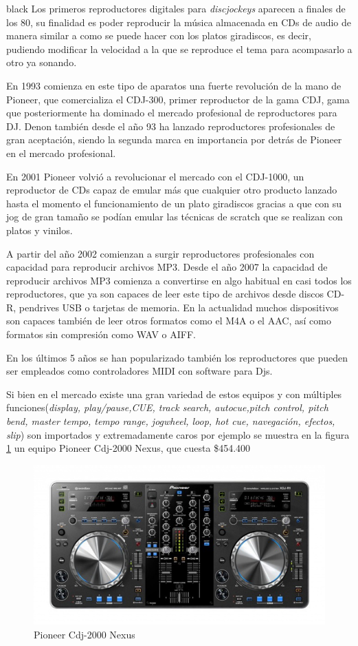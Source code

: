 \documentclass[11pt]{charter}
\begin{document}
\begin{consigna}{black}
Los primeros reproductores digitales para \textit{discjockeys} aparecen a finales de los 80, su finalidad es poder reproducir la música almacenada en CDs de audio de manera similar a como se puede hacer con los platos giradiscos, es decir, pudiendo modificar la velocidad a la que se reproduce el tema para acompasarlo a otro ya sonando.

En 1993 comienza en este tipo de aparatos una fuerte revolución de la mano de Pioneer, que comercializa el CDJ-300, primer reproductor de la gama CDJ, gama que posteriormente ha dominado el mercado profesional de reproductores para DJ. Denon también desde el año 93 ha lanzado reproductores profesionales de gran aceptación, siendo la segunda marca en importancia por detrás de Pioneer en el mercado profesional.

En 2001 Pioneer volvió a revolucionar el mercado con el CDJ-1000, un reproductor de CDs capaz de emular más que cualquier otro producto lanzado hasta el momento el funcionamiento de un plato giradiscos gracias a que con su jog de gran tamaño se podían emular las técnicas de scratch que se realizan con platos y vinilos. 

A partir del año 2002 comienzan a surgir reproductores profesionales con capacidad para reproducir archivos MP3. Desde el año 2007 la capacidad de reproducir archivos MP3 comienza a convertirse en algo habitual en casi todos los reproductores, que ya son capaces de leer este tipo de archivos desde discos CD-R, pendrives USB o tarjetas de memoria. En la actualidad muchos dispositivos son capaces también de leer otros formatos como el M4A o el AAC, así como formatos sin compresión como WAV o AIFF.

En los últimos 5 años se han popularizado también los reproductores que pueden ser empleados como controladores MIDI con software para Djs.

Si bien en el mercado existe una gran variedad de estos equipos y con múltiples funciones(\textit{display, play/pause,CUE, track search, autocue,pitch control, pitch bend, master tempo, tempo range, jogwheel, loop, hot cue, navegación, efectos, slip}) son importados y extremadamente caros por ejemplo se muestra en la figura \ref{fig:Pioneer} un equipo Pioneer Cdj-2000 Nexus, que cuesta \$454.400

\begin{figure}[htpb]
\centering 
\includegraphics[width=.7\textwidth]{./Figuras/reproductordigital.jpeg}
\caption{Pioneer Cdj-2000 Nexus}
\label{fig:Pioneer}
\end{figure}


\end{consigna}
\end{document}
